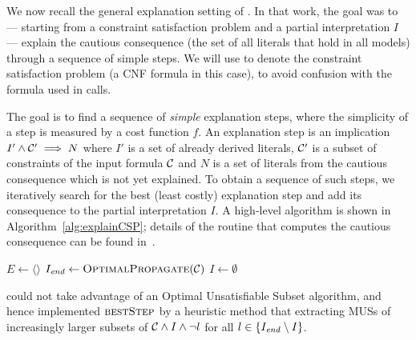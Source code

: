 
We now recall the general explanation setting of \citet{ecai/BogaertsGCG20}. 
In that work, the goal was to --- starting from a constraint satisfaction problem and a partial interpretation $I$ --- explain the cautious consequence (the set of all literals that hold in all models) through a sequence of simple steps. 
We will use \formulac to denote the constraint satisfaction problem (a CNF formula in this case), to avoid confusion with the formula \formula used in \omus calls.

The goal is to find a sequence of \textit{simple} explanation steps, where the simplicity of a step is measured by a cost function $f$. 
An explanation step is an implication $I' \wedge \mathcal{C} ' \implies N$ where $I'$ is a set of already derived literals, $\mathcal{C} '$ is a subset of constraints of the input formula $\mathcal{C} $ and $N$ is a set of literals from the cautious consequence which is not yet explained.
To obtain a sequence of such steps, we iteratively search for the best (least costly) explanation step and add its consequence to the partial interpretation $I$. A high-level algorithm is shown in Algorithm~\ref{alg:explainCSP}; details of the \optprop routine that computes the cautious consequence can be found in~\cite{ecai/BogaertsGCG20}.

\begin{algorithm}[t]
  \caption{$\call{ExplainCSP}(\formulac,f)$}
  \label{alg:explainCSP}
$E \gets \langle \rangle$\;
$I_{\mathit{end}} \gets \textsc{OptimalPropagate}(\mathcal{C} )$\;
$I \gets \emptyset$\;
\;
\end{algorithm}

\citet{ecai/BogaertsGCG20} could not take advantage of an Optimal Unsatisfiable Subset algorithm, and hence implemented $\textsc{bestStep}$ by a heuristic method that extracting MUSs of increasingly larger subsets of $\mathcal{C} \wedge I \wedge \lnot l$ for all $l \in \{I_{\mathit{end}} \setminus I\}$.


